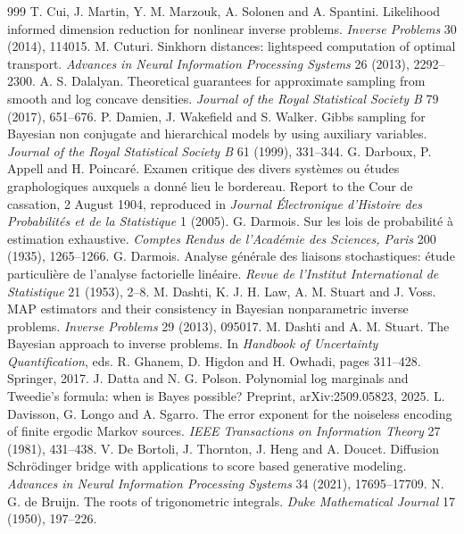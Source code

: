 \begin{thebibliography}{999}
 T. Cui, J. Martin, Y. M. Marzouk, A. Solonen and A. Spantini. Likelihood informed dimension reduction for nonlinear inverse problems. \emph{Inverse Problems} 30 (2014), 114015.
 M. Cuturi. Sinkhorn distances: lightspeed computation of optimal transport. \emph{Advances in Neural Information Processing Systems} 26 (2013), 2292--2300.
 A. S. Dalalyan. Theoretical guarantees for approximate sampling from smooth and log concave densities. \emph{Journal of the Royal Statistical Society B} 79 (2017), 651--676.
 P. Damien, J. Wakefield and S. Walker. Gibbs sampling for Bayesian non conjugate and hierarchical models by using auxiliary variables. \emph{Journal of the Royal Statistical Society B} 61 (1999), 331--344.
 G. Darboux, P. Appell and H. Poincar\'e. Examen critique des divers syst\`emes ou \'etudes graphologiques auxquels a donn\'e lieu le bordereau. Report to the Cour de cassation, 2 August 1904, reproduced in \emph{Journal \'Electronique d'Histoire des Probabilit\'es et de la Statistique} 1 (2005).
 G. Darmois. Sur les lois de probabilit\'e \`a estimation exhaustive. \emph{Comptes Rendus de l'Acad\'emie des Sciences, Paris} 200 (1935), 1265--1266.
 G. Darmois. Analyse g\'en\'erale des liaisons stochastiques: \'etude particuli\`ere de l'analyse factorielle lin\'eaire. \emph{Revue de l'Institut International de Statistique} 21 (1953), 2--8.
 M. Dashti, K. J. H. Law, A. M. Stuart and J. Voss. MAP estimators and their consistency in Bayesian nonparametric inverse problems. \emph{Inverse Problems} 29 (2013), 095017.
 M. Dashti and A. M. Stuart. The Bayesian approach to inverse problems. In \emph{Handbook of Uncertainty Quantification}, eds. R. Ghanem, D. Higdon and H. Owhadi, pages 311--428. Springer, 2017.
 J. Datta and N. G. Polson. Polynomial log marginals and Tweedie's formula: when is Bayes possible? Preprint, arXiv:2509.05823, 2025.
 L. Davisson, G. Longo and A. Sgarro. The error exponent for the noiseless encoding of finite ergodic Markov sources. \emph{IEEE Transactions on Information Theory} 27 (1981), 431--438.
 V. De Bortoli, J. Thornton, J. Heng and A. Doucet. Diffusion Schr\"odinger bridge with applications to score based generative modeling. \emph{Advances in Neural Information Processing Systems} 34 (2021), 17695--17709.
 N. G. de Bruijn. The roots of trigonometric integrals. \emph{Duke Mathematical Journal} 17 (1950), 197--226.

\end{thebibliography}
